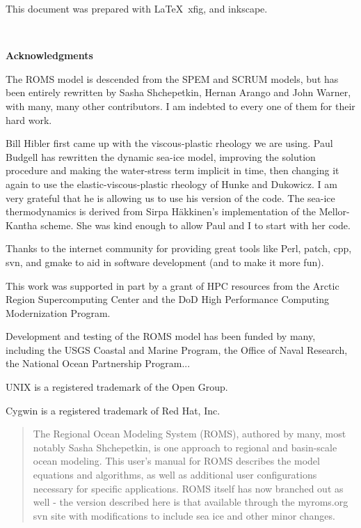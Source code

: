 \setcounter{page}{0}
This document was prepared with \LaTeX\, xfig, and inkscape.

\mbox{  }
\begin{center}
\bf \LARGE Acknowledgments
\end{center}

The ROMS model is descended from the SPEM and SCRUM models, but has
been entirely rewritten by Sasha Shchepetkin, Hernan Arango and John
Warner, with many, many other contributors. I am indebted to every one
of them for their hard work.

Bill Hibler first came up with the viscous-plastic rheology we are
using. Paul Budgell has rewritten the dynamic sea-ice model, improving
the solution procedure and making the water-stress term implicit in time,
then changing it again to use the elastic-viscous-plastic rheology of
Hunke and Dukowicz. I am very grateful that he is allowing us to use
his version of the code. The sea-ice thermodynamics is derived from
Sirpa H\"akkinen's implementation of the Mellor-Kantha scheme. She was
kind enough to allow Paul and I to start with her code.

Thanks to the internet community for providing great tools like Perl,
patch, cpp, svn, and gmake to aid in software development (and to make
it more fun).

This work was supported in part by a grant of HPC resources from the
Arctic Region Supercomputing Center and the DoD High Performance
Computing Modernization Program.

Development and testing of the ROMS model has been funded by many,
including the USGS Coastal and Marine Program, the Office of Naval
Research, the National Ocean Partnership Program...

\vspace{\fill}
UNIX is a registered trademark of the Open Group.

Cygwin is a registered trademark of Red Hat, Inc.


\vfil\break
\begin{abstract}
The Regional Ocean Modeling System (ROMS), authored by many, most
notably Sasha Shchepetkin, is one approach to regional and basin-scale ocean
modeling. This user's manual for ROMS describes the model equations
and algorithms, as well as additional user configurations necessary
for specific applications. ROMS itself has now branched out as
well - the version described here is that available through the
myroms.org svn site with modifications to include sea ice and other
minor changes.

\end{abstract}
